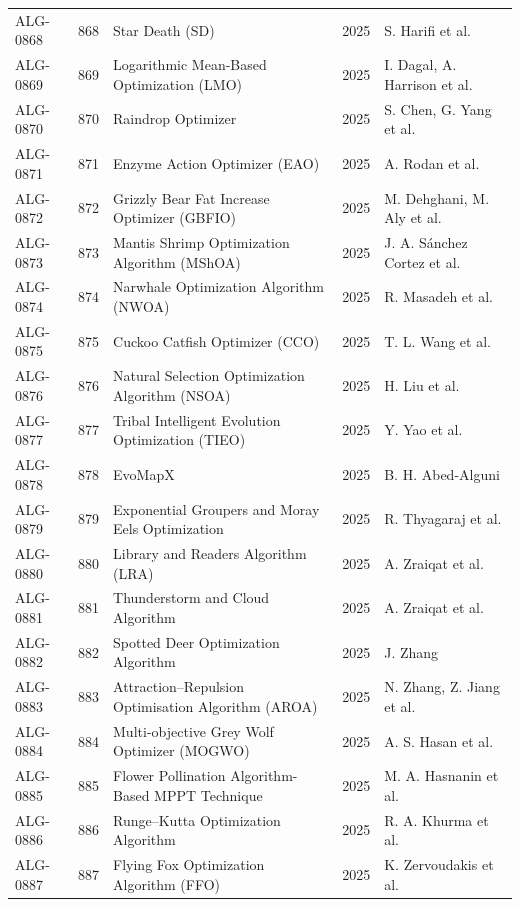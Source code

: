 \documentclass[8pt]{article}
\begin{document}
\begin{landscape}
\begin{longtable}{P{1.7cm}rP{10.0cm}rP{7.2cm}}
ALG-0868 & 868 & Star Death (SD) & 2025 & S. Harifi et al. \\
ALG-0869 & 869 & Logarithmic Mean-Based Optimization (LMO) & 2025 & I. Dagal, A. Harrison et al. \\
ALG-0870 & 870 & Raindrop Optimizer & 2025 & S. Chen, G. Yang et al. \\
ALG-0871 & 871 & Enzyme Action Optimizer (EAO) & 2025 & A. Rodan et al. \\
ALG-0872 & 872 & Grizzly Bear Fat Increase Optimizer (GBFIO) & 2025 & M. Dehghani, M. Aly et al. \\
ALG-0873 & 873 & Mantis Shrimp Optimization Algorithm (MShOA) & 2025 & J. A. Sánchez Cortez et al. \\
ALG-0874 & 874 & Narwhale Optimization Algorithm (NWOA) & 2025 & R. Masadeh et al. \\
ALG-0875 & 875 & Cuckoo Catfish Optimizer (CCO) & 2025 & T. L. Wang et al. \\
ALG-0876 & 876 & Natural Selection Optimization Algorithm (NSOA) & 2025 & H. Liu et al. \\
ALG-0877 & 877 & Tribal Intelligent Evolution Optimization (TIEO) & 2025 & Y. Yao et al. \\
ALG-0878 & 878 & EvoMapX & 2025 & B. H. Abed-Alguni \\
ALG-0879 & 879 & Exponential Groupers and Moray Eels Optimization & 2025 & R. Thyagaraj et al. \\
ALG-0880 & 880 & Library and Readers Algorithm (LRA) & 2025 & A. Zraiqat et al. \\
ALG-0881 & 881 & Thunderstorm and Cloud Algorithm & 2025 & A. Zraiqat et al. \\
ALG-0882 & 882 & Spotted Deer Optimization Algorithm & 2025 & J. Zhang \\
ALG-0883 & 883 & Attraction–Repulsion Optimisation Algorithm (AROA) & 2025 & N. Zhang, Z. Jiang et al. \\
ALG-0884 & 884 & Multi-objective Grey Wolf Optimizer (MOGWO) & 2025 & A. S. Hasan et al. \\
ALG-0885 & 885 & Flower Pollination Algorithm-Based MPPT Technique & 2025 & M. A. Hasnanin et al. \\
ALG-0886 & 886 & Runge–Kutta Optimization Algorithm & 2025 & R. A. Khurma et al. \\
ALG-0887 & 887 & Flying Fox Optimization Algorithm (FFO) & 2025 & K. Zervoudakis et al. \\
\end{longtable}
\end{landscape}
\end{document}
